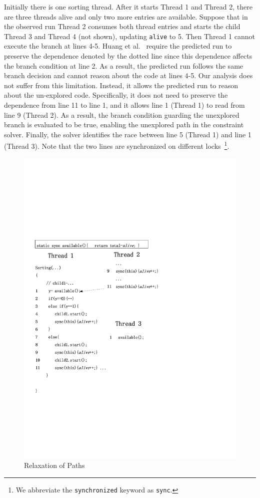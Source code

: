  
Initially there is one sorting thread. After it starts Thread 1 and Thread 2, there are three threads alive and only two more entries are available.
Suppose that in the observed run Thread 2 consumes both thread entries and starts the child Thread 3 and Thread 4 (not shown), updating {\tt alive} to 5. Then Thread 1 cannot execute the branch at lines 4-5. Huang et al.~\cite{} require the predicted run to preserve the dependence denoted by the dotted line since this dependence affects the branch condition at line 2. As a result, the predicted run follows the same branch decision and cannot reason about the code at lines 4-5. Our analysis does not suffer from this limitation. Instead, it allows the predicted run to reason about the un-explored code. Specifically, it does not need to preserve the dependence from line 11 to line 1, and it allows line 1 (Thread 1) to read from line 9 (Thread 2). As a result, the branch condition guarding the unexplored branch is evaluated to be true, enabling the unexplored path in the constraint solver. Finally, the solver identifies the race between line 5 (Thread 1) and line 1 (Thread 3). Note that the two lines are synchronized on different locks~\footnote{We abbreviate the {\tt synchronized} keyword as {\tt sync}.
}. 

 


\begin{figure}[htp]
\centering
\includegraphics[scale=0.7]{cases/Visio-msort.pdf}
\caption{Relaxation of Paths}\label{fig:relax2}
\end{figure}


